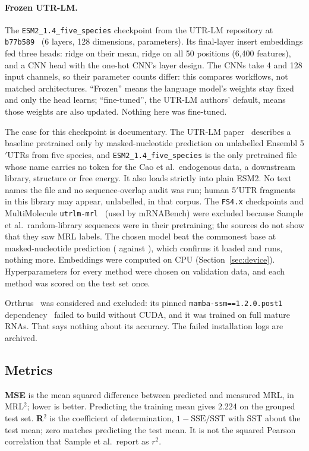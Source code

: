 \documentclass[11pt]{article}
\newcommand{\m}[1]{\texttt{#1}}
\begin{document}
\paragraph{Frozen UTR-LM.} The \m{ESM2\_1.4\_five\_species} checkpoint from the UTR-LM repository at
\m{b77b589}~\citep{utrlm_repo} (6 layers, 128 dimensions, \UTRLMParams{} parameters). Its final-layer insert
embeddings fed three heads: ridge on their mean, ridge on all 50 positions (6,400 features), and a CNN head with the
one-hot CNN's layer design. The CNNs take 4 and 128 input channels, so their parameter counts differ: this compares
workflows, not matched architectures. ``Frozen'' means the language model's weights stay fixed and only the head
learns; ``fine-tuned'', the UTR-LM authors' default, means those weights are also updated. Nothing here was
fine-tuned.

The case for this checkpoint is documentary. The UTR-LM paper~\citep{chu2024utrlm} describes a baseline pretrained
only by masked-nucleotide prediction on unlabelled Ensembl 5$'$UTRs from five species, and
\m{ESM2\_1.4\_five\_species} is the only pretrained file whose name carries no token for the Cao et al.\ endogenous
data, a downstream library, structure or free energy. It also loads strictly into plain ESM2. No text names the file
and no sequence-overlap audit was run; human 5$'$UTR fragments in this library may appear, unlabelled, in that
corpus. The \m{FS4.x} checkpoints and MultiMolecule \m{utrlm-mrl}~\citep{multimolecule_utrlm} (used by mRNABench) were
excluded because Sample et al.\ random-library sequences were in their pretraining; the sources do not show that they
saw MRL labels. The chosen model beat the commonest base at masked-nucleotide prediction (\MLMAcc{} against
\MajorityBase), which confirms it loaded and runs, nothing more. Embeddings were computed on CPU
(Section~\ref{sec:device}). Hyperparameters for every method were chosen on validation data, and each method was
scored on the test set once.

Orthrus~\citep{orthrus} was considered and excluded: its pinned \m{mamba-ssm==1.2.0.post1}
dependency~\citep{mamba_ssm} failed to build without CUDA, and it was trained on full mature RNAs. That says nothing
about its accuracy. The failed installation logs are archived.

\subsection{Metrics}\label{sec:metrics}
\textbf{MSE} is the mean squared difference between predicted and measured MRL, in MRL$^2$; lower is better.
Predicting the training mean gives 2.224 on the grouped test set. \textbf{R$^2$} is the coefficient of
determination, $1 - \mathrm{SSE}/\mathrm{SST}$ with SST about the test mean; zero matches predicting the test mean.
It is not the squared Pearson correlation that Sample et al.\ report as $r^2$.
\end{document}
